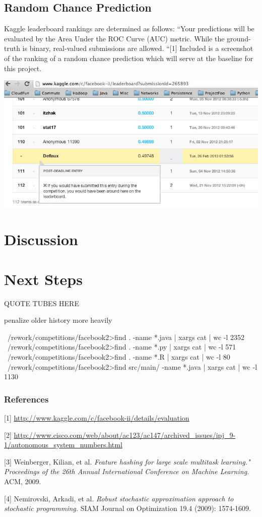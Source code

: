 \documentclass{article} %
\begin{document}
\subsection{Random Chance Prediction}

Kaggle leaderboard rankings are determined as follows: ``Your predictions
will be evaluated by the Area Under the ROC Curve (AUC) metric.  While the
ground-truth is binary, real-valued submissions are allowed. ``[1]  Included
is a screenshot of the ranking of a random chance prediction which will
serve at the baseline for this project.

  \begin{center}
    \includegraphics[scale=.4]{randomPredictions.png}
  \end{center}

\section{Discussion}

\section{Next Steps}

QUOTE TUBES HERE

penalize older history more heavily

~/rework/competitions/facebook2>find . -name *.java | xargs cat | wc -l
    2352
~/rework/competitions/facebook2>find . -name *.py | xargs cat | wc -l
     571
~/rework/competitions/facebook2>find . -name *.R | xargs cat | wc -l
      80
~/rework/competitions/facebook2>find src/main/ -name *.java | xargs cat | wc -l
    1130

\subsubsection*{References}

\small{
[1] \url{http://www.kaggle.com/c/facebook-ii/details/evaluation}

[2] \url{http://www.cisco.com/web/about/ac123/ac147/archived_issues/ipj_9-1/autonomous_system_numbers.html}

[3] Weinberger, Kilian, et al. {\it Feature hashing for large scale multitask learning." Proceedings of the 26th Annual International Conference on Machine Learning.} ACM, 2009.

[4] Nemirovski, Arkadi, et al. {\it Robust stochastic approximation approach to stochastic programming.} SIAM Journal on Optimization 19.4 (2009): 1574-1609.
}
\end{document}
